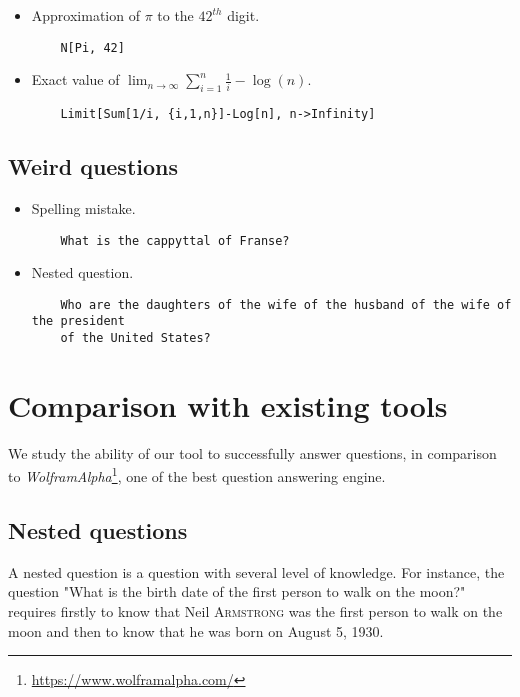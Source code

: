 \begin{itemize}
    \item Approximation of $\pi$ to the $42^{th}$ digit.
    \begin{verbatim}
    N[Pi, 42]
    \end{verbatim}

    \item Exact value of $\lim_{n\rightarrow \infty} \sum_{i=1}^n \frac{1}{i} - \log(n)$.
    \begin{verbatim}
    Limit[Sum[1/i, {i,1,n}]-Log[n], n->Infinity]
    \end{verbatim}
\end{itemize}

\subsection{Weird questions}

\begin{itemize}
    \item Spelling mistake.
    \begin{verbatim}
    What is the cappyttal of Franse?
    \end{verbatim}

    \item Nested question.
    \begin{verbatim}
    Who are the daughters of the wife of the husband of the wife of the president
    of the United States?
    \end{verbatim}
\end{itemize}

\section{Comparison with existing tools}

We study the ability of our tool to successfully answer questions, in comparison
to \emph{WolframAlpha}\footnote{\url{https://www.wolframalpha.com/}}, one of the best
question answering engine.

\subsection{Nested questions}

A nested question is a question with several level of knowledge. For instance, the
question "What is the birth date of the first person to walk on the moon?" requires
firstly to know that Neil \textsc{Armstrong} was the first person to walk on the
moon and then to know that he was born on August 5, 1930.

